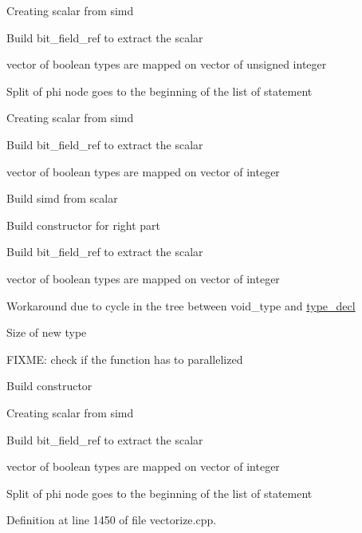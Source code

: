 Creating scalar from simd

Build bit\+\_\+field\+\_\+ref to extract the scalar

vector of boolean types are mapped on vector of unsigned integer

Split of phi node goes to the beginning of the list of statement

Creating scalar from simd

Build bit\+\_\+field\+\_\+ref to extract the scalar

vector of boolean types are mapped on vector of integer

Build simd from scalar

Build constructor for right part

Build bit\+\_\+field\+\_\+ref to extract the scalar

vector of boolean types are mapped on vector of integer

Workaround due to cycle in the tree between void\+\_\+type and \hyperlink{structtype__decl}{type\+\_\+decl}

Size of new type

F\+I\+X\+ME\+: check if the function has to parallelized

Build constructor

Creating scalar from simd

Build bit\+\_\+field\+\_\+ref to extract the scalar

vector of boolean types are mapped on vector of integer

Split of phi node goes to the beginning of the list of statement 

Definition at line 1450 of file vectorize.\+cpp.



